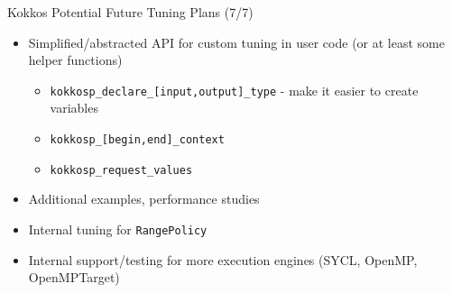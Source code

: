\begin{frame}[fragile]{Kokkos Potential Future Tuning Plans (7/7)}
  \begin{itemize}
      \item Simplified/abstracted API for custom tuning in user code (or at least some helper functions)
      \begin{itemize}
        \item \texttt{kokkosp\_declare\_[input,output]\_type} - make it easier to create variables
        \item \texttt{kokkosp\_[begin,end]\_context}
        \item \texttt{kokkosp\_request\_values}
      \end{itemize}
      \item Additional examples, performance studies
      \item Internal tuning for \texttt{RangePolicy}
      \item Internal support/testing for more execution engines (SYCL, OpenMP, OpenMPTarget)
  \end{itemize}
\end{frame}

